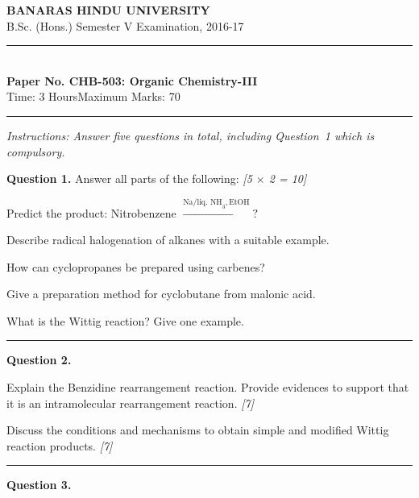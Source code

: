 \documentclass[11pt,a4paper]{article}
\newcommand{\pts}[1]{\hfill   \textit{[#1]}}
\begin{document}
\begin{center}
  {\large\bfseries BANARAS HINDU UNIVERSITY}\\[2pt]
  {\normalsize B.Sc. (Hons.) Semester V Examination, 2016-17}\\[6pt]
  \rule{0.8\linewidth}{0.5pt}\\[6pt]
  {\large\bfseries Paper No. CHB-503: Organic Chemistry-III}\\[4pt]
  {\normalsize Time: 3 Hours\hfill Maximum Marks: 70}
\end{center}
\rule{\linewidth}{0.4pt}
\small



\noindent   \textit{Instructions: Answer five questions in total, including Question~1 which is compulsory.}

\normalsize
\bigskip




\noindent   \textbf{Question 1.} Answer all parts of the following: \pts{5 $ \times$ 2 = 10}

\begin{parts}
  \item Predict the product: Nitrobenzene $\xrightarrow{ \text{Na/liq. NH}_3,  \text{EtOH}} ?$
  \item Describe radical halogenation of alkanes with a suitable example.
  \item How can cyclopropanes be prepared using carbenes?
  \item Give a preparation method for cyclobutane from malonic acid.
  \item What is the Wittig reaction? Give one example.
\end{parts}

\medskip\rule{\linewidth}{0.2pt}




\noindent   \textbf{Question 2.}

\begin{parts}
  \item Explain the Benzidine rearrangement reaction. Provide evidences to support that it is an intramolecular rearrangement reaction. \pts{7}
  \item Discuss the conditions and mechanisms to obtain simple and modified Wittig reaction products. \pts{7}
\end{parts}

\medskip\rule{\linewidth}{0.2pt}




\noindent   \textbf{Question 3.}
\end{document}

